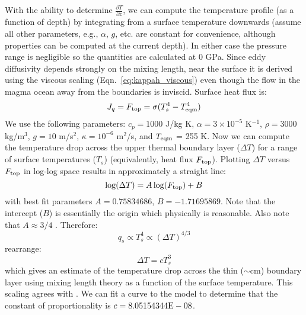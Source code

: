 With the ability to determine $\frac{\partial T}{\partial z}$, we can compute the temperature profile (as a function of depth) by integrating from a surface temperature  downwards (assume all other parameters, e.g., $\alpha$, $g$, etc. are constant for convenience, although properties can be computed at the current depth).  In either case the pressure range is negligible so the quantities are calculated at 0 GPa.  Since eddy diffusivity depends strongly on the mixing length, near the surface it is derived using the viscous scaling (Eqn.~\ref{eq:kappah_viscous}) even though the flow in the magma ocean away from the boundaries is inviscid.  Surface heat flux is:
\begin{equation}
J_q = F_{\rm top} = \sigma (T_s^4 - T_{\rm eqm}^4)
\end{equation}
We use the following parameters: $c_p=1000$ J/kg K, $\alpha=3 \times 10^{-5}$ K$^{-1}$, $\rho=3000$ kg/m$^3$, $g=10$ m/s$^2$, $\kappa=10^{-6}$ m$^2$/s, and $T_{\rm eqm}$ = 255 K.  Now we can compute the temperature drop across the upper thermal boundary layer ($\Delta T$) for a range of surface temperatures ($T_s$) (equivalently, heat flux $F_{\rm top}$).  Plotting $\Delta T$ versus $F_{\rm top}$ in log-log space results in approximately a straight line:
\begin{equation}
\log(\Delta T) = A \log( F_{\rm top} ) + B
\end{equation}
with best fit parameters $A=0.75834686$, $B=-1.71695869$.  Note that the intercept ($B$) is essentially the origin which physically is reasonable.  Also note that $A \approx 3/4$ .  Therefore:
\begin{equation}
q_s \propto T_s^4 \propto (\Delta T)^{4/3}
\end{equation}
rearrange:
\begin{equation}
\Delta T = c T_s^3
\end{equation}
which gives an estimate of the temperature drop across the thin ($\sim$cm) boundary layer using mixing length theory as a function of the surface temperature.  This scaling agrees with \cite{RS06}.  We can fit a curve to the model to determine that the constant of proportionality is $c=8.05154344{\rm E-08}$.
